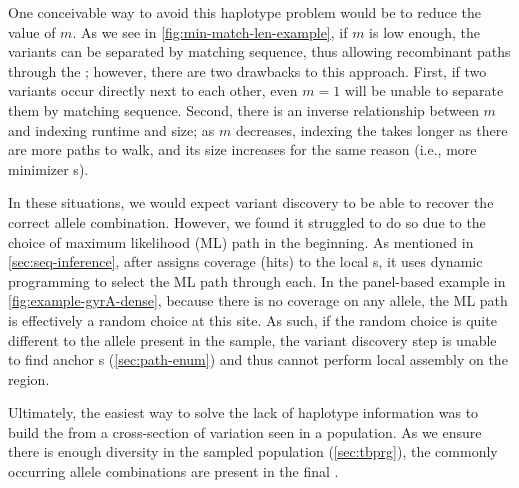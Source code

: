 One conceivable way to avoid this haplotype problem would be to reduce the value of $m$. As we see in \autoref{fig:min-match-len-example}, if $m$ is low enough, the variants can be separated by matching sequence, thus allowing recombinant paths through the \prg{}; however, there are two drawbacks to this approach. First, if two variants occur directly next to each other, even $m=1$ will be unable to separate them by matching sequence. Second, there is an inverse relationship between $m$ and indexing runtime and size; as $m$ decreases, indexing the \prg{} takes longer as there are more paths to walk, and its size increases for the same reason (i.e., more minimizer \kmer{}s).

In these situations, we would expect \denovo{} variant discovery to be able to recover the correct allele combination. However, we found it struggled to do so due to the choice of maximum likelihood (ML) path in the beginning. As mentioned in \autoref{sec:seq-inference}, after \pandora{} assigns \kmer{} coverage (hits) to the local \prg{}s, it uses dynamic programming to select the ML path through each. In the panel-based \prg{} example in \autoref{fig:example-gyrA-dense}, because there is no coverage on any allele, the ML path is effectively a random choice at this site. As such, if the random choice is quite different to the allele present in the sample, the \denovo{} variant discovery step is unable to find anchor \kmer{}s (\autoref{sec:path-enum}) and thus cannot perform local assembly on the region.

Ultimately, the easiest way to solve the lack of haplotype information was to build the \prg{} from a cross-section of variation seen in a population. As we ensure there is enough diversity in the sampled population (\autoref{sec:tbprg}), the commonly occurring allele combinations are present in the final \prg{}.

